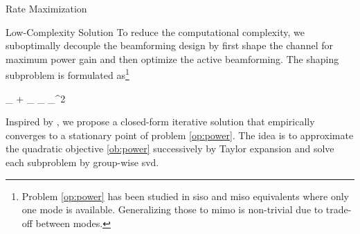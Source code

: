 \documentclass[journal]{IEEEtran}
\begin{document}
\begin{section}{Rate Maximization}
	\begin{subsection}{Low-Complexity Solution}
		\label{sc:rate_lc}
		To reduce the computational complexity, we suboptimally decouple the beamforming design by first shape the channel for maximum power gain and then optimize the active beamforming.
		The shaping subproblem is formulated as\footnote{%
			\label{fn:power_gain}%
			Problem \eqref{op:power} has been studied in \gls{siso} \cite{Shen2020a} and \gls{miso} equivalents \cite{Santamaria2023,Fang2023,Nerini2023,Nerini2023b} where only one mode is available. Generalizing those to \gls{mimo} is non-trivial due to trade-off between modes.
		}
		\begin{maxi!}
			{\scriptstyle{\mathbf{\Theta}}}{\lVert {}_ + _ \mathbf{\Theta} _ \rVert _^2}{\label{op:power}}{\label{ob:power}}
		\end{maxi!}
		Inspired by \cite{Nie2017}, we propose a closed-form iterative solution that empirically converges to a stationary point of problem \eqref{op:power}.
		The idea is to approximate the quadratic objective \eqref{ob:power} successively by Taylor expansion and solve each subproblem by group-wise \gls{svd}.


\end{subsection}
\end{section}
\end{document}
